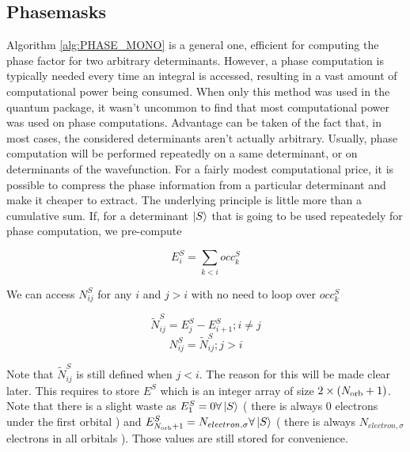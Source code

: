 \subsection{Phasemasks}


Algorithm \ref{alg:PHASE_MONO} is a general one, efficient for computing the phase factor for two arbitrary determinants. However, a phase computation is typically needed every time an integral is accessed, resulting in a vast amount of computational power being consumed. When only this method was used in the quantum package, it wasn't uncommon to find that most computational power was used on phase computations.
Advantage can be taken of the fact that, in most cases, the considered determinants aren't actually arbitrary. Usually, phase computation will be performed repeatedly on a same determinant, or on determinants of the wavefunction. For a fairly modest computational price, it is possible to compress the phase information from a particular determinant and make it cheaper to extract. The underlying principle is little more than a cumulative sum. If, for a determinant $\ket S$ that is going to be used repeatedely for phase computation, we pre-compute
        
$$E^S_{i} = \sum_{k < i} occ^{S}_{k}$$
        
We can access $N^S_{ij}$ for any $i$ and $j>i$ with no need to loop over $occ^{S}_{k}$

$$\tilde N^S_{ij} = E^S_j - E^S_{i+1} ; i \neq j$$
$$N^S_{ij} = \tilde N^S_{ij} ; j>i$$

Note that $\tilde N^S_{ij}$ is still defined when $j<i$. The reason for this will be made clear later.
This requires to store $E^S$ which is an integer array of size $2 \times ({N_\text{orb}}+1)$. Note that there is a slight waste as $E^S_1 = 0 \forall \ket S$ ( there is always $0$ electrons under the first orbital ) and $E^S_{{N_\text{orb}}+1} = N_{electron,\sigma} \forall \ket S$ ( there is always $N_{electron,\sigma}$ electrons in all orbitals ). Those values are still stored for convenience.

